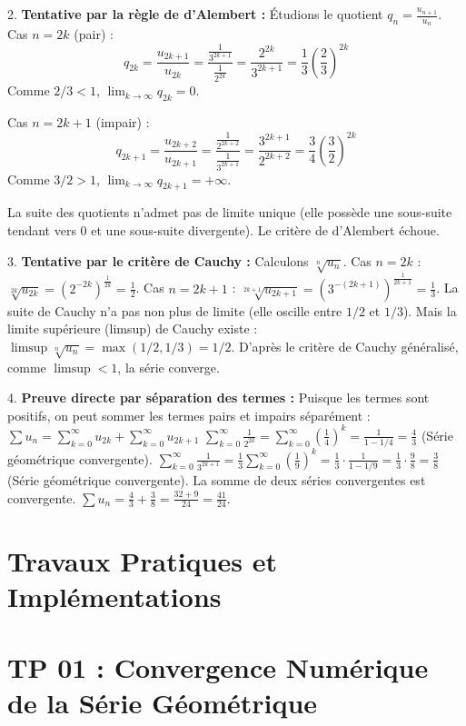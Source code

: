 \documentclass[12pt, a4paper]{article}
\begin{document}
2. \textbf{Tentative par la règle de d'Alembert :}
   Étudions le quotient $q_n = \frac{u_{n+1}}{u_n}$.
   Cas $n = 2k$ (pair) :
   $$q_{2k} = \frac{u_{2k+1}}{u_{2k}} = \frac{\frac{1}{3^{2k+1}}}{\frac{1}{2^{2k}}} = \frac{2^{2k}}{3^{2k+1}} = \frac{1}{3} \left(\frac{2}{3}\right)^{2k}$$
   Comme $2/3 < 1$, $\lim_{k \to \infty} q_{2k} = 0$.

   Cas $n = 2k+1$ (impair) :
   $$q_{2k+1} = \frac{u_{2k+2}}{u_{2k+1}} = \frac{\frac{1}{2^{2k+2}}}{\frac{1}{3^{2k+1}}} = \frac{3^{2k+1}}{2^{2k+2}} = \frac{3}{4} \left(\frac{3}{2}\right)^{2k}$$
   Comme $3/2 > 1$, $\lim_{k \to \infty} q_{2k+1} = +\infty$.

   La suite des quotients n'admet pas de limite unique (elle possède une sous-suite tendant vers 0 et une sous-suite divergente). Le critère de d'Alembert échoue.

3. \textbf{Tentative par le critère de Cauchy :}
   Calculons $\sqrt[n]{u_n}$.
   Cas $n = 2k$ : $\sqrt[2k]{u_{2k}} = \left(2^{-2k}\right)^{\frac{1}{2k}} = \frac{1}{2}$.
   Cas $n = 2k+1$ : $\sqrt[2k+1]{u_{2k+1}} = \left(3^{-(2k+1)}\right)^{\frac{1}{2k+1}} = \frac{1}{3}$.
   La suite de Cauchy n'a pas non plus de limite (elle oscille entre $1/2$ et $1/3$).
   Mais la limite supérieure (limsup) de Cauchy existe :
   $\limsup \sqrt[n]{u_n} = \max(1/2, 1/3) = 1/2$.
   D'après le critère de Cauchy généralisé, comme $\limsup < 1$, la série converge.

4. \textbf{Preuve directe par séparation des termes :}
   Puisque les termes sont positifs, on peut sommer les termes pairs et impairs séparément :
   $\sum u_n = \sum_{k=0}^\infty u_{2k} + \sum_{k=0}^\infty u_{2k+1}$
   $\sum_{k=0}^\infty \frac{1}{2^{2k}} = \sum_{k=0}^\infty \left(\frac{1}{4}\right)^k = \frac{1}{1 - 1/4} = \frac{4}{3}$ (Série géométrique convergente).
   $\sum_{k=0}^\infty \frac{1}{3^{2k+1}} = \frac{1}{3} \sum_{k=0}^\infty \left(\frac{1}{9}\right)^k = \frac{1}{3} \cdot \frac{1}{1 - 1/9} = \frac{1}{3} \cdot \frac{9}{8} = \frac{3}{8}$ (Série géométrique convergente).
   La somme de deux séries convergentes est convergente.
   $\sum u_n = \frac{4}{3} + \frac{3}{8} = \frac{32 + 9}{24} = \frac{41}{24}$.


\section{Travaux Pratiques et Implémentations}


\section*{TP 01 : Convergence Numérique de la Série Géométrique}
\end{document}
